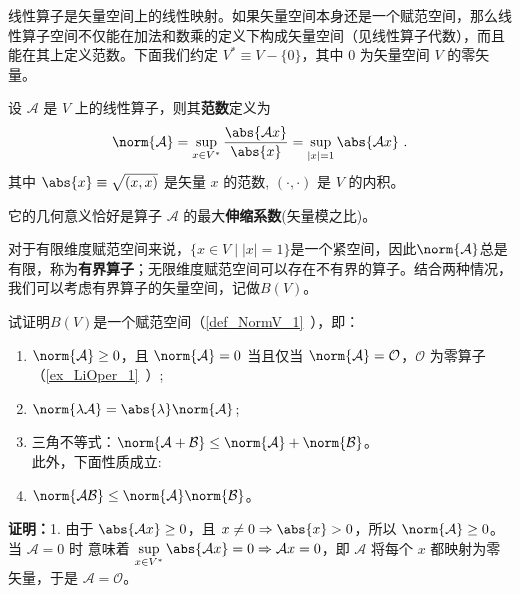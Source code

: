 

线性算子是矢量空间上的线性映射。如果矢量空间本身还是一个赋范空间，那么线性算子空间不仅能在加法和数乘的定义下构成矢量空间（见线性算子代数），而且能在其上定义范数。下面我们约定 $V^* \equiv V - \{0\}$，其中 $0$ 为矢量空间 $V$ 的零矢量。

\begin{definition}{}\label{def_ONorm_1}
设 $\mathcal A$ 是 $V$ 上的线性算子，则其\textbf{范数}定义为
\begin{equation}\label{eq_ONorm_1}
\norm{\mathcal A} = \sup_{x\in{V^*}}\frac{\abs{\mathcal Ax}}{\abs{x}} = \sup_{|x| = 1} \abs{\mathcal A x}~.
\end{equation}
其中 $\abs{x}\equiv\sqrt{(x,x)}$ 是矢量 $x$ 的范数, $(\cdot,\cdot)$ 是 $V$ 的内积。
\end{definition}
它的几何意义恰好是算子 $\mathcal A$ 的最大\textbf{伸缩系数}(矢量模之比)。


对于有限维度赋范空间来说，$\{x \in V \mid |x| = 1\}$是一个紧空间，因此$\norm{\mathcal A}$总是有限，称为\textbf{有界算子}；无限维度赋范空间可以存在不有界的算子。结合两种情况，我们可以考虑有界算子的矢量空间，记做$B(V)$。

\begin{example}{}
试证明$B(V)$是一个赋范空间（\autoref{def_NormV_1}~），即：
\begin{enumerate}
\item $\norm{\mathcal A}\geq0$，且 $\norm{\mathcal A}=0$ 当且仅当 $\norm{\mathcal A}=\mathcal O$，$\mathcal O$ 为零算子（\autoref{ex_LiOper_1}~）;
\item $\norm{\lambda \mathcal A}=\abs{\lambda}\norm{\mathcal A}$;
\item 三角不等式：$\norm{\mathcal A+\mathcal B}\leq\norm{\mathcal A}+\norm{\mathcal B}$。\\
此外，下面性质成立:\\
\item $\norm{\mathcal{AB}}\leq{\norm{\mathcal A}}\norm{\mathcal B}$。
\end{enumerate}
\end{example}

\textbf{证明：}1. 由于 $\abs{\mathcal A x}\geq0$，且 $x\neq0\Rightarrow\abs{x}>0$，所以
$\norm{\mathcal A}\geq0$。当 $\mathcal A=0$ 时 意味着 $\sup\limits_{x\in{V^*}}\abs{\mathcal A x}=0\Rightarrow\mathcal A x=0$，即 $\mathcal A$ 将每个 $x$ 都映射为零矢量，于是 $\mathcal A=\mathcal O$。

